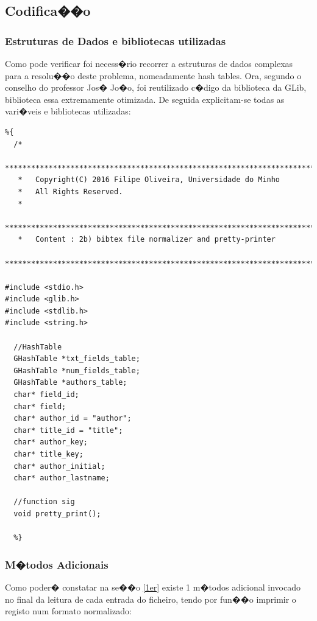 \documentclass{report}
\begin{document}
\subsection{Codifica��o }
\subsubsection{Estruturas de Dados e bibliotecas utilizadas}
Como pode verificar foi necess�rio recorrer a  estruturas de dados complexas para a resolu��o deste problema, nomeadamente hash tables. Ora, segundo o conselho do professor Jos� Jo�o, foi reutilizado c�digo da biblioteca da GLib, biblioteca essa extremamente otimizada.
De seguida explicitam-se todas as vari�veis e bibliotecas utilizadas:
\begin{lstlisting}
%{
  /*
   ********************************************************************************
   *   Copyright(C) 2016 Filipe Oliveira, Universidade do Minho
   *   All Rights Reserved.
   *
   ********************************************************************************
   *   Content : 2b) bibtex file normalizer and pretty-printer
   ********************************************************************************/

#include <stdio.h>
#include <glib.h>
#include <stdlib.h>
#include <string.h>

  //HashTable
  GHashTable *txt_fields_table; 
  GHashTable *num_fields_table; 
  GHashTable *authors_table; 
  char* field_id;
  char* field;
  char* author_id = "author";
  char* title_id = "title";
  char* author_key;
  char* title_key;
  char* author_initial;
  char* author_lastname;

  //function sig
  void pretty_print();

  %}
  \end{lstlisting}

  \subsubsection{M�todos Adicionais}
  Como poder� constatar na se��o \ref{1er} existe 1 m�todos adicional invocado no final da leitura de cada entrada do ficheiro, tendo por fun��o imprimir o registo num formato normalizado:
\end{document}
